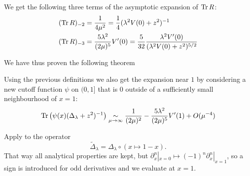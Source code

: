 We get the following three terms of the asymptotic expansion of $\operatorname{Tr} R$:
\begin{align}
  (\operatorname{Tr} R)_{-2} &= \frac{1}{4\mu^2} = \frac{1}{4} (\lambda^2V(0) + z^2)^{-1} \\
  (\operatorname{Tr} R)_{-3} &= \frac{5\lambda^2}{(2\mu)^5} V'(0) =
  \frac{5}{32}\frac{\lambda^2 V'(0)}{(\lambda^2 V(0) + z^2)^{5/2}}
\end{align}

We have thus proven the following theorem
\begin{MainTheorem}
  \label{main:boundary}
  
  \begin{Corollary}
    \label{cor:boundary}
    Using the previous definitions we also get the expansion near $1$ by
    considering a new cutoff function $\psi$ on $(0,1]$ that is $0$ outside of a
    sufficiently small neighbourhood of $x=1$:
    \begin{equation*}
      \operatorname{Tr}\left(\psi(x)(\Delta_\lambda + z^2)^{-1}\right) \mathrel{\underset{\mu\to\infty}{\sim}}
      \frac{1}{(2\mu)^2} - \frac{5\lambda^2}{(2\mu)^5} V'(1) + O(\mu^{-4})
    \end{equation*}
    \begin{Proof}
      Apply  to the operator
      \begin{equation*}
        \tilde\Delta_\lambda = \Delta_\lambda\circ(x\mapsto 1-x).
      \end{equation*}
      That way all analytical properties are kept, but $\partial_x^n|_{x=0}
      \mapsto (-1)^n \partial_x^n|_{x=1}$, so a sign is introduced for odd
      derivatives and we evaluate at $x=1$.
    \end{Proof}
  \end{Corollary}
\end{MainTheorem}
